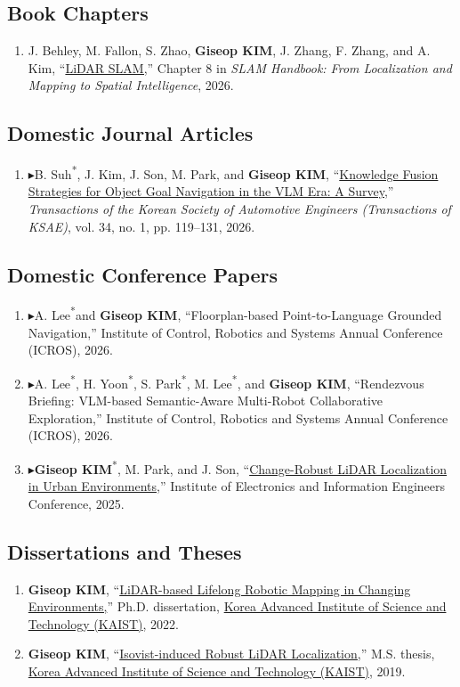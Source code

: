 \documentclass[10pt,a4paper]{article}
\newcommand{\pub}[2]{\Needspace{4\baselineskip}\item[#1.] #2}
\newcommand{\leadpub}{\textbf{\ensuremath{\blacktriangleright}}\hspace{0.25em}}
\newcommand{\me}{\textbf{Giseop KIM}}
\newcommand{\corr}{\textsuperscript{\dag}}
\newcommand{\first}{\textsuperscript{*}}
\begin{document}
\subsection{Book Chapters}
\begin{enumerate}
\pub{B1}{J. Behley, M. Fallon, S. Zhao, \me, J. Zhang, F. Zhang, and A. Kim, ``\href{https://github.com/SLAM-Handbook-contributors/slam-handbook-public-release}{LiDAR SLAM,}'' Chapter 8 in \textit{SLAM Handbook: From Localization and Mapping to Spatial Intelligence}, 2026.}
\end{enumerate}

\subsection{Domestic Journal Articles}
\begin{enumerate}
\pub{DJ1}{\leadpub B. Suh\first, J. Kim, J. Son, M. Park, and \me\corr, ``\href{http://journal.ksae.org/_common/do.php?a=current\&b=21\&bidx=4298\&aidx=47641}{Knowledge Fusion Strategies for Object Goal Navigation in the VLM Era: A Survey,}'' \textit{Transactions of the Korean Society of Automotive Engineers (Transactions of KSAE)}, vol. 34, no. 1, pp. 119--131, 2026.}
\end{enumerate}

\subsection{Domestic Conference Papers}
\begin{enumerate}
\pub{DC3}{\leadpub A. Lee\first and \me\corr, ``Floorplan-based Point-to-Language Grounded Navigation,'' Institute of Control, Robotics and Systems Annual Conference (ICROS), 2026.}
\pub{DC2}{\leadpub A. Lee\first, H. Yoon\first, S. Park\first, M. Lee\first, and \me\corr, ``Rendezvous Briefing: VLM-based Semantic-Aware Multi-Robot Collaborative Exploration,'' Institute of Control, Robotics and Systems Annual Conference (ICROS), 2026.}
\pub{DC1}{\leadpub \me\first\corr, M. Park, and J. Son, ``\href{https://www.dbpia.co.kr/journal/articleDetail?nodeId=NODE12551179}{Change-Robust LiDAR Localization in Urban Environments,}'' Institute of Electronics and Information Engineers Conference, 2025.}
\end{enumerate}

\subsection{Dissertations and Theses}
\begin{enumerate}
\pub{T2}{\me, ``\href{https://library.kaist.ac.kr/search/detail/view.do?bibCtrlNo=996232\&flag=dissertation}{LiDAR-based Lifelong Robotic Mapping in Changing Environments,}'' Ph.D. dissertation, \href{https://www.kaist.ac.kr/en/}{Korea Advanced Institute of Science and Technology (KAIST)}, 2022.}
\pub{T1}{\me, ``\href{https://gisbi-kim.github.io/uploads/gkim-dissertation-ms.pdf}{Isovist-induced Robust LiDAR Localization,}'' M.S. thesis, \href{https://www.kaist.ac.kr/en/}{Korea Advanced Institute of Science and Technology (KAIST)}, 2019.}
\end{enumerate}
\end{document}
